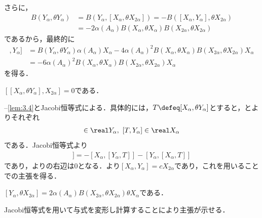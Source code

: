 \begin{npfwn}
  さらに，
  \begin{align*}
    B(Y_{\alpha}, \theta Y_{\alpha}) &= B(Y_{\alpha},[X_{\alpha}, \theta X_{2\alpha}]) = -B([X_{\alpha}, Y_{\alpha}], \theta X_{2\alpha}) \\
                                     &= -2\alpha(A_{\alpha})B(X_{\alpha},\theta X_{\alpha})B(X_{2\alpha}, \theta X_{2\alpha})
  \end{align*}
  であるから，最終的に
  \begin{align*}
    [[X_{\alpha}, \theta Y_{\alpha}], Y_{\alpha}] &=  B(Y_{\alpha}, \theta Y_{\alpha})\alpha(A_{\alpha})X_{\alpha} - 4\alpha(A_{\alpha})^2B(X_{\alpha}, \theta X_{\alpha})B(X_{2\alpha}, \theta X_{2\alpha})X_{\alpha} \\
                                                  &= -6\alpha(A_{\alpha})^2B(X_{\alpha}, \theta X_{\alpha})B(X_{2\alpha}, \theta X_{2\alpha})X_{\alpha}
  \end{align*}
を得る．  
\end{npfwn}

\begin{lem}\label{lem:3.5}
  $[[X_{\alpha}, \theta Y_{\alpha}], X_{2\alpha}] = 0$である．
\end{lem}
\begin{npfwn}
  --\ref{lem:3.4}とJacobi恒等式による．具体的には，$T\defeq [X_{\alpha},\theta Y_{\alpha}] $とすると，とよりそれぞれ
  \begin{align}
    [T, X_{\alpha}] \in \real Y_{\alpha} ,\ [T, Y_{\alpha}] \in \real X_{\alpha}\label{eq:lem3.5}
  \end{align}
  である．Jacobi恒等式より
  \begin{align}
    [T, [X_{\alpha},Y_{\alpha}]] = -[X_{\alpha},[Y_{\alpha},T]] - [Y_{\alpha},[X_{\alpha},T]]\label{eq:lem3.5-2}
  \end{align}
  であり，よりの右辺は0となる．より$[X_{\alpha}, Y_{\alpha}] = cX_{2\alpha} $であり，これを用いることでの主張を得る．
\end{npfwn}

\begin{lem}\label{lem:3.6}
  $[Y_{\alpha},\theta X_{2\alpha}] = 2\alpha(A_{\alpha})B(X_{2\alpha}, \theta X_{2\alpha})\theta X_{\alpha} $である．  
\end{lem}
\begin{npfwn}
  Jacobi恒等式を用いて与式を変形し計算することにより主張が示せる．
\end{npfwn}



